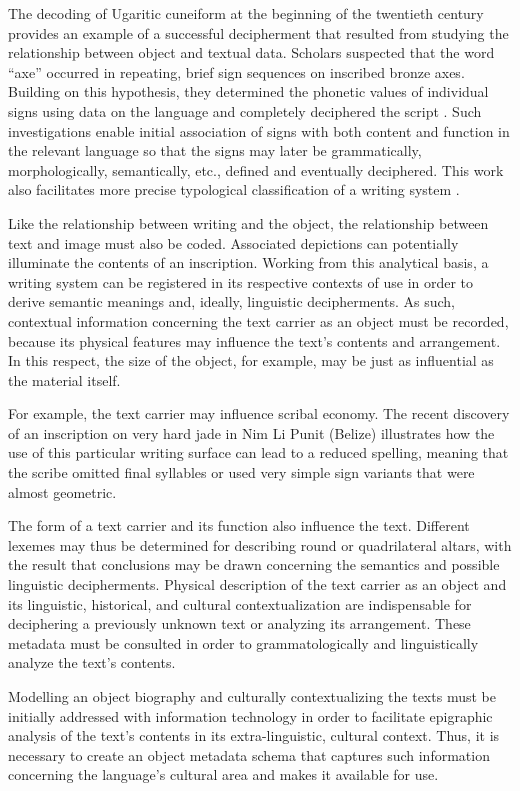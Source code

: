 \documentclass[amsthm,ebook]{saparticle}
\begin{document}
The decoding of Ugaritic cuneiform at the beginning of the twentieth century provides an example of a successful
decipherment that resulted from studying the relationship between object and textual data. Scholars suspected that the
word ``axe'' occurred in repeating, brief sign sequences on inscribed bronze axes. Building on this hypothesis, they
determined the phonetic values of individual signs using data on the %
language and completely deciphered the script \citep{Day2002}. Such investigations enable initial association of signs with both content and function in the
relevant language so that the signs may later be grammatically, morphologically, semantically, etc., defined and
eventually deciphered. This work also facilitates more precise typological classification of a writing system
\citep{Gronemeyer2015}.

Like the relationship between writing and the object, the relationship between text and image must also be coded.
Associated depictions can potentially illuminate the contents of an inscription. Working from this analytical basis, a
writing system can be registered in its respective contexts of use in order to derive semantic meanings and, ideally,
linguistic decipherments. As such, contextual information concerning the text carrier as an object must be recorded,
because its physical features may influence the text’s contents and arrangement. In this respect, the size of the
object, for example, may be just as influential as the material itself.

For example, the text carrier may influence scribal economy. The recent discovery of an inscription on very hard jade in
Nim Li Punit (Belize) illustrates how the use of this particular writing surface can lead to a reduced spelling,
meaning that the scribe omitted final syllables or used very simple sign variants that were almost geometric. 

The form of a text carrier and its function also influence the text. Different lexemes may thus be determined for
describing round or quadrilateral altars, with the result that conclusions may be drawn concerning the semantics and
possible linguistic decipherments. Physical description of the text carrier as an object and its linguistic,
historical, and cultural contextualization are indispensable for deciphering a previously unknown text or analyzing its
arrangement. These metadata must be consulted in order to grammatologically and linguistically analyze the text’s
contents. 

Modelling an object biography and culturally contextualizing the texts must be initially addressed with information
technology in order to facilitate epigraphic analysis of the text’s contents in its extra-linguistic, cultural context.
Thus, it is necessary to create an object metadata schema that captures such information concerning the language’s
cultural area and makes it available for use. 
\end{document}
